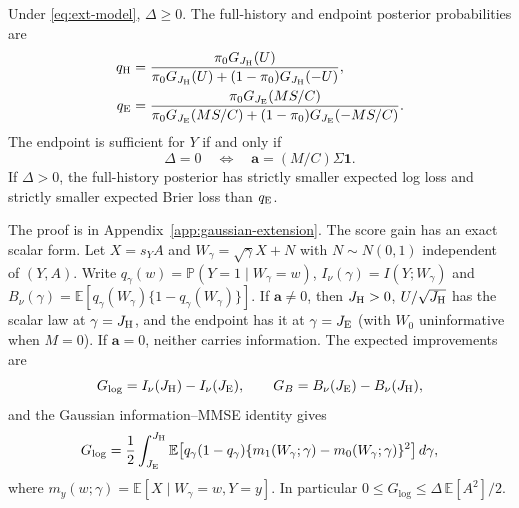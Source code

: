\documentclass[runningheads]{llncs}
\newcommand{\E}{\mathbb E}
\newcommand{\Prob}{\mathbb P}
\begin{document}
\begin{proposition}
\label{prop:ext-sufficiency}
Under \eqref{eq:ext-model}, $\Delta\geq0$. The full-history and endpoint posterior probabilities are
\begin{align}
 q_{\rm H}&=\frac{\pi_0G_{J_{\rm H}}(U)}{\pi_0G_{J_{\rm H}}(U)+(1-\pi_0)G_{J_{\rm H}}(-U)},\nonumber\\
 q_{\rm E}&=\frac{\pi_0G_{J_{\rm E}}(MS/C)}{\pi_0G_{J_{\rm E}}(MS/C)+(1-\pi_0)G_{J_{\rm E}}(-MS/C)}.
 \label{eq:ext-posteriors}
\end{align}
The endpoint is sufficient for $Y$ if and only if
\begin{equation}
 \Delta=0\quad\Longleftrightarrow\quad\boldsymbol a=(M/C)\Sigma\boldsymbol1.
 \label{eq:ext-criterion}
\end{equation}
If $\Delta>0$, the full-history posterior has strictly smaller expected log loss and strictly smaller expected Brier loss than $q_{\rm E}$.
\end{proposition}
The proof is in Appendix~\ref{app:gaussian-extension}. The score gain has an exact scalar form. Let $X=s_YA$ and $W_\gamma=\sqrt\gamma X+N$ with $N\sim N(0,1)$ independent of $(Y,A)$. Write $q_\gamma(w)=\Prob(Y=1\mid W_\gamma=w)$, $I_\nu(\gamma)=I(Y;W_\gamma)$ and $B_\nu(\gamma)=\E[q_\gamma(W_\gamma)\{1-q_\gamma(W_\gamma)\}]$. If $\boldsymbol a\neq0$, then $J_{\rm H}>0$, $U/\sqrt{J_{\rm H}}$ has the scalar law at $\gamma=J_{\rm H}$, and the endpoint has it at $\gamma=J_{\rm E}$ (with $W_0$ uninformative when $M=0$). If $\boldsymbol a=0$, neither carries information. The expected improvements are
\begin{equation}
 G_{\log}=I_\nu(J_{\rm H})-I_\nu(J_{\rm E}),\qquad G_B=B_\nu(J_{\rm E})-B_\nu(J_{\rm H}),
 \label{eq:ext-score-gains}
\end{equation}
and the Gaussian information--MMSE identity \cite{guo2005mutual} gives
\begin{equation}
 G_{\log}=\frac12\int_{J_{\rm E}}^{J_{\rm H}}\E\!\left[q_\gamma(1-q_\gamma)\{m_1(W_\gamma;\gamma)-m_0(W_\gamma;\gamma)\}^2\right]d\gamma,
 \label{eq:ext-conditional-immse}
\end{equation}
where $m_y(w;\gamma)=\E[X\mid W_\gamma=w,Y=y]$. In particular $0\leq G_{\log}\leq\Delta\,\E[A^2]/2$.
\end{document}
